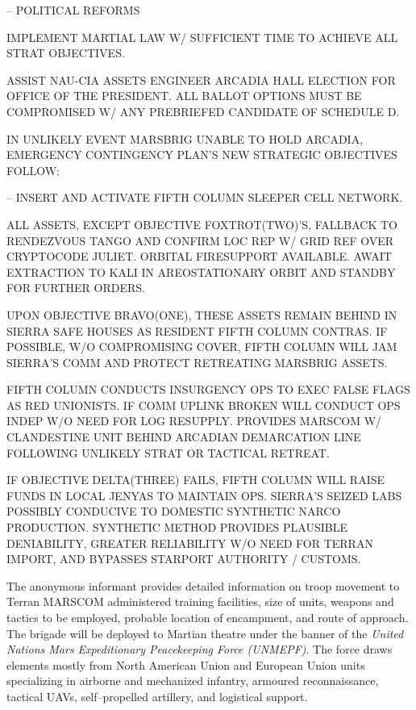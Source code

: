 \item {} -- POLITICAL REFORMS
    \startitemize[n]
    \item IMPLEMENT MARTIAL LAW W/ SUFFICIENT TIME TO ACHIEVE ALL STRAT OBJECTIVES.
    \item ASSIST NAU-CIA ASSETS ENGINEER ARCADIA HALL ELECTION FOR OFFICE OF THE PRESIDENT. ALL BALLOT OPTIONS MUST BE COMPROMISED W/ ANY PREBRIEFED CANDIDATE OF SCHEDULE D.
    \stopitemize
\stopitemize

IN UNLIKELY EVENT MARSBRIG UNABLE TO HOLD ARCADIA, EMERGENCY CONTINGENCY PLAN'S NEW STRATEGIC OBJECTIVES FOLLOW:
\startitemize[4]
\item {} -- INSERT AND ACTIVATE FIFTH COLUMN SLEEPER CELL NETWORK.

    \startitemize[n]
    \item ALL ASSETS, EXCEPT OBJECTIVE FOXTROT(TWO)'S, FALLBACK TO RENDEZVOUS TANGO AND CONFIRM LOC REP W/ GRID REF OVER CRYPTOCODE JULIET. ORBITAL FIRESUPPORT AVAILABLE. AWAIT EXTRACTION TO KALI IN AREOSTATIONARY ORBIT AND STANDBY FOR FURTHER ORDERS.

    \item UPON OBJECTIVE BRAVO(ONE), THESE ASSETS REMAIN BEHIND IN SIERRA SAFE HOUSES AS RESIDENT FIFTH COLUMN CONTRAS. IF POSSIBLE, W/O COMPROMISING COVER, FIFTH COLUMN WILL JAM SIERRA'S COMM AND PROTECT RETREATING MARSBRIG ASSETS.

    \item FIFTH COLUMN CONDUCTS INSURGENCY OPS TO EXEC FALSE FLAGS AS RED UNIONISTS. IF COMM UPLINK BROKEN WILL CONDUCT OPS INDEP W/O NEED FOR LOG RESUPPLY. PROVIDES MARSCOM W/ CLANDESTINE UNIT BEHIND ARCADIAN DEMARCATION LINE FOLLOWING UNLIKELY STRAT OR TACTICAL RETREAT.

    \item IF OBJECTIVE DELTA(THREE) FAILS, FIFTH COLUMN WILL RAISE FUNDS IN LOCAL JENYAS TO MAINTAIN OPS. SIERRA'S SEIZED LABS POSSIBLY CONDUCIVE TO DOMESTIC SYNTHETIC NARCO PRODUCTION. SYNTHETIC METHOD PROVIDES PLAUSIBLE DENIABILITY, GREATER RELIABILITY W/O NEED FOR TERRAN IMPORT, AND BYPASSES STARPORT AUTHORITY / CUSTOMS.
    \stopitemize
\stopitemize
\stopTimelineCorrespondenceDocument

The anonymous informant provides detailed information on troop movement to Terran MARSCOM administered training facilities, size of units, weapons and tactics to be employed, probable location of encampment, and route of approach. The brigade will be deployed to Martian theatre under the banner of the {\it United Nations Mars Expeditionary Peacekeeping Force (UNMEPF)}. The force draws elements mostly from North American Union and European Union units specializing in airborne and mechanized infantry, armoured reconnaissance, tactical UAVs, self--propelled artillery, and logistical support.

